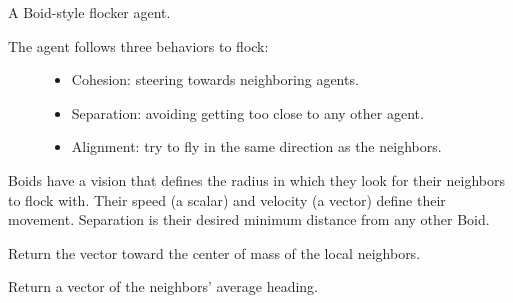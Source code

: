 \documentclass[letterpaper,10pt,english]{sphinxmanual}
\begin{document}
\begin{fulllineitems}
\label{\detokenize{index:examples.boid_flockers.boid_flockers.boid.Boid}}
A Boid-style flocker agent.
\begin{description}
\item[{The agent follows three behaviors to flock:}] \leavevmode\begin{itemize}
\item {} 
Cohesion: steering towards neighboring agents.

\item {} 
Separation: avoiding getting too close to any other agent.

\item {} 
Alignment: try to fly in the same direction as the neighbors.

\end{itemize}

\end{description}

Boids have a vision that defines the radius in which they look for their
neighbors to flock with. Their speed (a scalar) and velocity (a vector)
define their movement. Separation is their desired minimum distance from
any other Boid.

\begin{fulllineitems}
\label{\detokenize{index:examples.boid_flockers.boid_flockers.boid.Boid.cohere}}
Return the vector toward the center of mass of the local neighbors.

\end{fulllineitems}


\begin{fulllineitems}
\label{\detokenize{index:examples.boid_flockers.boid_flockers.boid.Boid.match_heading}}
Return a vector of the neighbors’ average heading.


\end{fulllineitems}
\end{fulllineitems}
\end{document}
